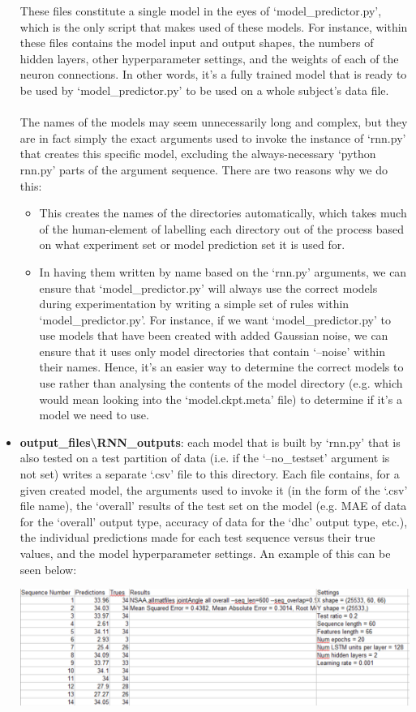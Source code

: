 \documentclass[12pt,twoside]{report}
\begin{document}
\begin{itemize}
\quad These files constitute a single model in the eyes of ‘model\_predictor.py’, which is the only script that makes used of these models. For instance, within these files contains the model input and output shapes, the numbers of hidden layers, other hyperparameter settings, and the weights of each of the neuron connections. In other words, it’s a fully trained model that is ready to be used by ‘model\_predictor.py’ to be used on a whole subject’s data file.\\\\
\quad The names of the models may seem unnecessarily long and complex, but they are in fact simply the exact arguments used to invoke the instance of ‘rnn.py’ that creates this specific model, excluding the always-necessary ‘python rnn.py’ parts of the argument sequence. There are two reasons why we do this:
	\begin{itemize}
		\item This creates the names of the directories automatically, which takes much of the human-element of labelling each directory out of the process based on what experiment set or model prediction set it is used for.
		\item In having them written by name based on the ‘rnn.py’ arguments, we can ensure that ‘model\_predictor.py’ will always use the correct models during experimentation by writing a simple set of rules within ‘model\_predictor.py’. For instance, if we want ‘model\_predictor.py’ to use models that have been created with added Gaussian noise, we can ensure that it uses only model directories that contain ‘--noise' within their names. Hence, it’s an easier way to determine the correct models to use rather than analysing the contents of the model directory (e.g. which would mean looking into the ‘model.ckpt.meta’ file) to determine if it’s a model we need to use.
	\end{itemize}
	\item \textbf{output\_files\textbackslash RNN\_outputs}: each model that is built by ‘rnn.py’ that is also tested on a test partition of data (i.e. if the ‘--no\_testset’ argument is not set) writes a separate ‘.csv’ file to this directory. Each file contains, for a given created model, the arguments used to invoke it (in the form of the ‘.csv’ file name), the ‘overall’ results of the test set on the model (e.g. MAE of data for the ‘overall’ output type, accuracy of data for the ‘dhc’ output type, etc.), the individual predictions made for each test sequence versus their true values, and the model hyperparameter settings. An example of this can be seen below:
\begin{center}
\includegraphics[scale=0.2]{project_figures/fig6_2}
\end{center}
\end{itemize}
\end{document}
